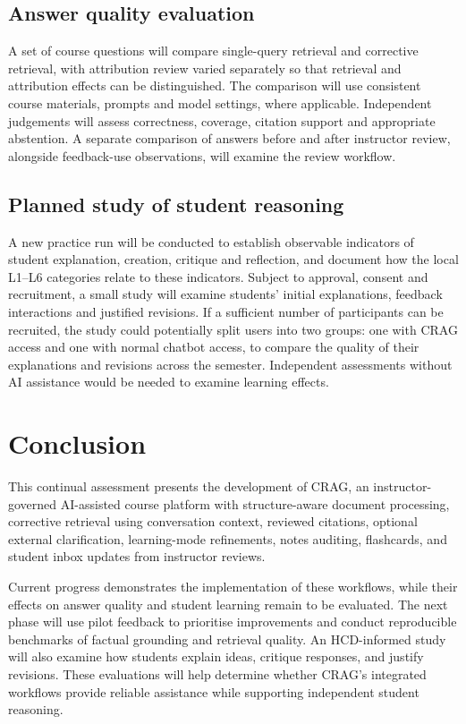 \section{Answer quality evaluation}
A set of course questions will compare single-query retrieval and corrective retrieval, with attribution review varied separately so that retrieval and attribution effects can be distinguished. The comparison will use consistent course materials, prompts and model settings, where applicable. Independent judgements will assess correctness, coverage, citation support and appropriate abstention. A separate comparison of answers before and after instructor review, alongside feedback-use observations, will examine the review workflow.

\section{Planned study of student reasoning}
A new practice run will be conducted to establish observable indicators of student explanation, creation, critique and reflection, and document how the local L1--L6 categories relate to these indicators. Subject to approval, consent and recruitment, a small study will examine students' initial explanations, feedback interactions and justified revisions. If a sufficient number of participants can be recruited, the study could potentially split users into two groups: one with CRAG access and one with normal chatbot access, to compare the quality of their explanations and revisions across the semester. Independent assessments without AI assistance would be needed to examine learning effects.

\chapter{Conclusion}
This continual assessment presents the development of CRAG, an instructor-governed AI-assisted course platform with structure-aware document processing, corrective retrieval using conversation context, reviewed citations, optional external clarification, learning-mode refinements, notes auditing, flashcards, and student inbox updates from instructor reviews.

Current progress demonstrates the implementation of these workflows, while their effects on answer quality and student learning remain to be evaluated. The next phase will use pilot feedback to prioritise improvements and conduct reproducible benchmarks of factual grounding and retrieval quality. An HCD-informed study will also examine how students explain ideas, critique responses, and justify revisions. These evaluations will help determine whether CRAG's integrated workflows provide reliable assistance while supporting independent student reasoning.


